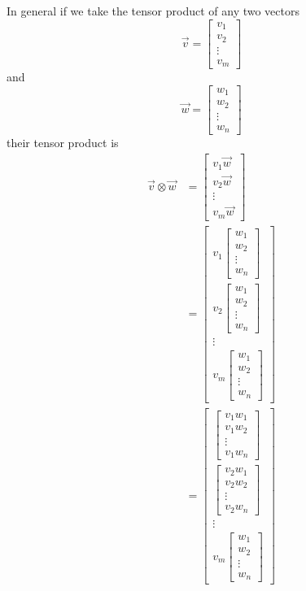 \documentclass{article}
\theoremstyle{definition}
\begin{document}
In general if we take the tensor product of any two vectors
\begin{equation}
	\vec{v} = \begin{bmatrix}v_1\\ v_2\\ \vdots\\ v_m\end{bmatrix}
\end{equation}
and
\begin{equation}
	\vec{w} = \begin{bmatrix}w_1\\ w_2\\ \vdots\\ w_n\end{bmatrix}
\end{equation}
their tensor product is
\begin{align}
	\vec{v} \otimes \vec{w} &= \begin{bmatrix}v_1 \vec{w}\\ v_2 \vec{w}\\ \vdots \\ v_m \vec{w}\end{bmatrix}\\
	&= \begin{bmatrix}v_1 \begin{bmatrix}w_1\\ w_2\\ \vdots\\ w_n\end{bmatrix}\\ v_2 \begin{bmatrix}w_1\\ w_2\\ \vdots\\ w_n\end{bmatrix}\\ \vdots \\ v_m \begin{bmatrix}w_1\\ w_2\\ \vdots\\ w_n\end{bmatrix}\end{bmatrix}\\
	&= \begin{bmatrix}\begin{bmatrix}v_1 w_1\\ v_1 w_2\\ \vdots\\ v_1 w_n\end{bmatrix}\\ \begin{bmatrix}v_2 w_1\\ v_2 w_2\\ \vdots\\ v_2 w_n\end{bmatrix}\\ \vdots \\ v_m \begin{bmatrix}w_1\\ w_2\\ \vdots\\ w_n\end{bmatrix}\end{bmatrix}\\

\end{align}
\end{document}

